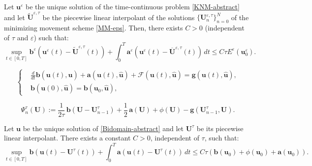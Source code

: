 \documentclass[10pt,a4paper]{amsart}
\newcommand{\U}{\mathbf{U}}
\newcommand{\e}{\varepsilon}
\begin{document}
\begin{theorem}
	Let $\mathbf{u}^\e$ be the unique solution of the time-continuous problem \eqref{KNM-abstract} and let $\widetilde{\U}^{\e, \tau}$ be the piecewise linear interpolant of the solutions $\{\U^{\e,\tau}_n\}_{n=0}^N$ of the minimizing movement scheme \eqref{MM-eps}. Then, there exists $C > 0$ (independent of $\tau$ and $\e$) such that:
	\begin{equation}
		\label{final-error-estimate}
		\sup_{t \in [0, T]} \mathbf{b}^\e(\mathbf{u}^\e(t) - \widetilde{\mathbf{U}}^{\e, \tau}(t)) + \int_0^T \mathbf{a}^\e(\mathbf{u}^\e(t) - \overline{\mathbf{U}}^{\e, \tau}(t)) \, dt \le C \tau E^\e(\mathbf{u}_0^\e).
	\end{equation}
\end{theorem}

\begin{equation}
	\label{Bidomain-abstract}
	\left\{
	\begin{aligned}
		&\frac{d}{dt} \mathbf{b}(\mathbf{u}(t), \widehat{\mathbf{u}}) + \mathbf{a}(\mathbf{u}(t), \widehat{\mathbf{u}}) + \mathcal{F}(\mathbf{u}(t), \widehat{\mathbf{u}}) = \mathbf{g}(\mathbf{u}(t), \widehat{\mathbf{u}}), \\
		&\mathbf{b}(\mathbf{u}(0), \widehat{\mathbf{u}}) = \mathbf{b}(\mathbf{u}_0, \widehat{\mathbf{u}}),
	\end{aligned}
	\right.
\end{equation}

\begin{equation}
	\label{MM-eps-tt}
	\Psi_{n}^{\tau}(\mathbf{U}) := \frac{1}{2\tau}\, \mathbf{b}\left(\mathbf{U} - \mathbf{U}_{n-1}^\tau\right) + \frac{1}{2}\, \mathbf{a}(\mathbf{U}) + \phi(\mathbf{U}) - \mathbf{g}\left(\mathbf{U}_{n-1}^\tau, \mathbf{U}\right).
\end{equation}

\begin{theorem}
	Let $\mathbf{u}$ be the unique solution of \eqref{Bidomain-abstract} and let $\mathbf{U}^{\tau}$ be its piecewise linear interpolant. There exists a constant $C > 0$, independent of $\tau$, such that:
	\begin{equation}
		\label{final-error-estimate-bidomain}
		\sup_{t \in [0,T]} \mathbf{b}(\mathbf{u}(t) - \mathbf{U}^{\tau}(t)) + \int_0^T \mathbf{a}(\mathbf{u}(t) - \mathbf{U}^{\tau}(t)) \, dt \le C \tau (\mathbf{b}(\mathbf{u}_0) + \phi(\mathbf{u}_0) + \mathbf{a}(\mathbf{u}_0)).
	\end{equation}
\end{theorem}
\end{document}
